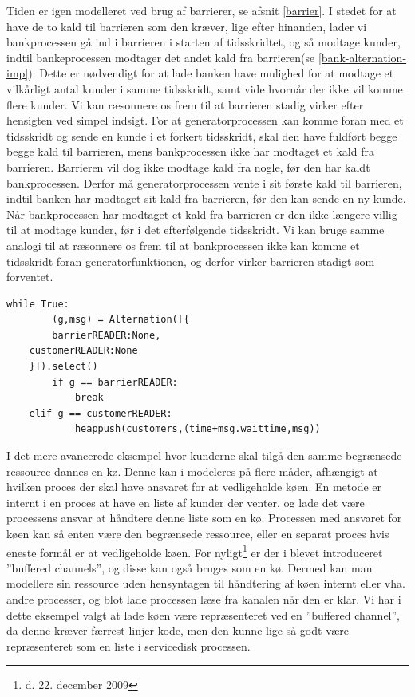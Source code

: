 Tiden er igen modelleret ved brug af barrierer, se afsnit \cref{barrier}. I 
stedet for at have de to kald til barrieren som den kræver, lige efter hinanden, lader 
vi bankprocessen gå ind i barrieren i starten af tidsskridtet, og så modtage 
kunder, indtil bankeprocessen modtager det andet kald fra barrieren(se 
\cref{bank-alternation-imp}). Dette er nødvendigt for at lade banken have 
mulighed for at modtage et vilkårligt antal kunder i samme tidsskridt, samt 
vide hvornår der ikke vil komme flere kunder.  Vi kan ræsonnere os frem til at 
barrieren stadig virker efter hensigten ved  simpel indsigt.
For at generatorprocessen kan komme foran med et tidsskridt og sende en kunde i et forkert tidsskridt,
skal den have fuldført begge begge kald til barrieren, mens bankprocessen ikke 
har modtaget et kald fra barrieren. Barrieren vil dog ikke modtage kald fra 
nogle, før den har  kaldt bankprocessen. Derfor må generatorprocessen vente i 
sit første kald til barrieren, indtil banken har modtaget sit kald fra 
barrieren, før den kan sende en ny kunde.
Når bankprocessen har modtaget et kald fra barrieren er den ikke længere villig 
til at modtage kunder, før i det efterfølgende tidsskridt. Vi kan bruge samme 
analogi til at ræsonnere os frem til at bankprocessen ikke kan komme et 
tidsskridt foran generatorfunktionen, og derfor virker barrieren stadigt som 
forventet. 

\begin{lstlisting}[float=hbtp,label=bank-alternation-imp,caption=Modtage en 
  kunde eller barrierekald i Bankprocessen]
while True:
		(g,msg) = Alternation([{
		barrierREADER:None,
    customerREADER:None
    }]).select()
		if g == barrierREADER:
			break
    elif g == customerREADER:
			heappush(customers,(time+msg.waittime,msg))
\end{lstlisting}


I det mere avancerede eksempel hvor kunderne skal tilgå den samme begrænsede 
ressource dannes en kø. Denne kan i \pycsp modeleres på flere måder, afhængigt 
at hvilken proces der skal have ansvaret for at vedligeholde køen. En metode er 
internt i en proces at have en liste af kunder der venter, og lade det være 
processens ansvar at håndtere denne liste som en kø. Processen med ansvaret for køen kan 
så enten være den begrænsede ressource, eller en separat proces hvis eneste 
formål er at vedligeholde køen. For nyligt\footnote{d. 22. december 2009} er 
der i \pycsp blevet introduceret ''buffered channels''\cite{pycsp-r147}, og 
disse kan også bruges som en kø. Dermed kan man modellere sin ressource uden 
hensyntagen til håndtering af køen internt eller vha. andre processer, og blot 
lade processen læse fra kanalen når den er klar. Vi har i dette eksempel valgt 
at lade køen være repræsenteret ved en ''buffered channel'', da denne  kræver 
færrest linjer kode, men den kunne lige så godt være repræsenteret som en liste 
i servicedisk processen.


